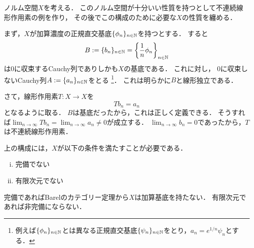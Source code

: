 \documentclass[a4j]{jarticle}
\begin{document}
ノルム空間$X$を考える．
このノルム空間が十分いい性質を持つとして不連続線形作用素の例を作り，
その後でこの構成のために必要な$X$の性質を纏める．

まず，$X$が加算濃度の正規直交基底$\{ \phi_n \}_{n \in \mathbb{N}}$を持つとする．
すると
\[ B:=\{b_n\}_{n \in \mathbb{N}}=\left\{\frac{1}{n} \phi_n \right\}_{n \in \mathbb{N}} \]
は0に収束するCauchy列でありしかも$X$の基底である．
これに対し，
0に収束しないCauchy列$A:=\{ a_n \}_{n \in \mathbb{N}}$をとる
\footnote{例えば$\{ \phi_n \}_{n \in \mathbb{N}}$とは異なる正規直交基底$\{ \psi_n \}_{n \in \mathbb{N}}$をとり，$a_n=e^{1/n} \psi_n$とする．}．
これは明らかに$B$と線形独立である．

さて，線形作用素$T:X \to X$を
\[ Tb_n=a_n \]
となるように取る．
$B$は基底だったから，これは正しく定義できる．
そうすれば$\lim_{n \to \infty} Tb_n=\lim_{n \to \infty} a_n \neq 0$が成立する．
$\lim_{n \to \infty} b_n=0$であったから，$T$は不連続線形作用素．

上の構成には，$X$が以下の条件を満たすことが必要である．
\begin{enumerate}[i)]
    \item 完備でない
    \item 有限次元でない
\end{enumerate}
完備であればBarelのカテゴリー定理から$X$は加算基底を持たない．
有限次元であれば非完備にならない．
\end{document}
